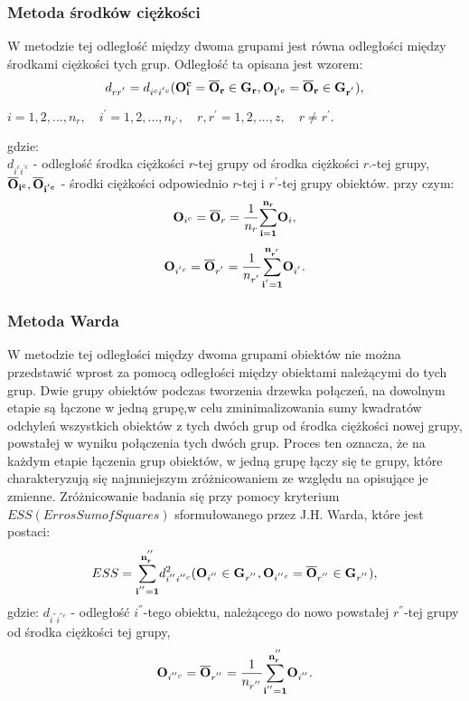 \documentclass[12pt,a4paper]{report}
\begin{document}
\subsubsection{Metoda środków ciężkości}
\noindent

W metodzie tej odległość między dwoma grupami jest równa odległości między środkami ciężkości tych grup. Odległość ta opisana jest wzorem: 
\begin{equation}
d_{rr^{'}}=d_{i^{c}i^{'c}}(\bf{O_i^{c}}=\overline{O}_{r}\in G_{r}, O_{i^{'c}}=\overline{O}_{r} \in G_{r^{'}}),
\end{equation}
\begin{center}
$i=1,2,...,n_{r}, \quad i^{'}=1,2,...,n_{r^{'}}, \quad r,r^{'}=1,2,...,z, \quad r \neq r^{'}. $
\end{center}
gdzie:\\
$d_{i^{c}i^{'c}}$ - odległość środka ciężkości $r$-tej grupy od środka ciężkości $r_{'}$-tej grupy,\\
$\bf{\overline{O}_{i^{c}},\overline{O}_{i^{'c}}}$ - środki ciężkości odpowiednio $r$-tej i $r^{'}$-tej grupy obiektów. przy czym:
\begin{equation}
\bold{O}_{i^{c}}=\bold{\overline{O}}_{r}=\frac{1}{n_{r}}\bold{\sum_{i=1}^{n_{r}}} \bold{O}_{i},
\end{equation}
\begin{equation}
\bold{O}_{i^{'c}}=\bold{\overline{O}}_{r^{'}}=\frac{1}{n_{r^{'}}}\bold{\sum_{i^{'}=1}^{n_{r^{'}}}} \bold{O}_{i^{'}}.
\end{equation}

\subsubsection{Metoda Warda}
\noindent

W metodzie tej odległości między dwoma grupami obiektów nie można przedstawić wprost za pomocą odległości między obiektami należącymi do tych grup. Dwie grupy obiektów podczas tworzenia drzewka połączeń, na dowolnym etapie są łączone w jedną grupę,w celu zminimalizowania sumy kwadratów odchyleń wszystkich obiektów z tych dwóch grup od środka ciężkości nowej grupy, powstałej w wyniku połączenia tych dwóch grup. Proces ten oznacza, że na każdym etapie łączenia grup obiektów, w jedną grupę łączy się te grupy, które charakteryzują się najmniejszym zróżnicowaniem ze względu na opisujące je zmienne. Zróżnicowanie badania się przy pomocy kryterium $ESS (Erros Sum of Squares)$ sformułowanego przez J.H. Warda, które jest postaci:
\begin{equation}
ESS= \bold{\sum_{i^{''}=1}^{n_r^{''}}} d_{i^{''}i^{''c}}^2 ( \bold{O}_{i^{''}} \in \bold{G}_{r^{''}}, \bold{O}_{i^{''c}}=\bold{\overline{O}}_{r^{''}} \in \bold{G}_{r^{''}} ),
\end{equation} 
gdzie:
$d_{i^{''}i^{''c}}$ - odległość $i^{''}$-tego obiektu, należącego do nowo powstałej $r^{''}$-tej grupy od środka ciężkości tej grupy,\\
\begin{equation}
\bold{O}_{i^{''c}} = \bold{\overline{O}}_{r^{''}}=\frac{1}{n_{r^{''}}} \bold{\sum_{i^{''}=1}^{n_r^{''}}} \bold{O}_{i^{''}}.
\end{equation}
\end{document}
